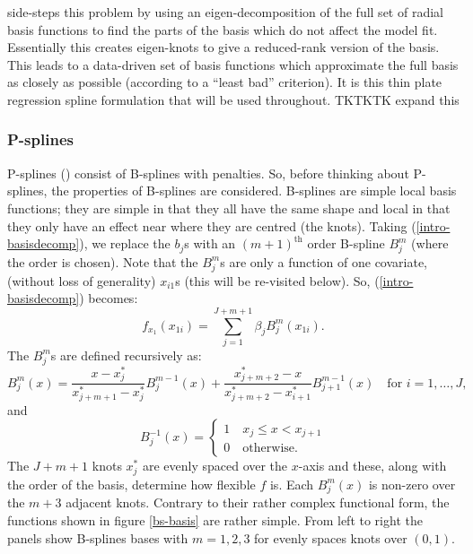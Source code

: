  side-steps this problem by using an eigen-decomposition of the full set of radial basis functions to find the parts of the basis which do not affect the model fit. Essentially this creates eigen-knots to give a reduced-rank version of the basis. This leads to a data-driven set of basis functions which approximate the full basis as closely as possible (according to a ``least bad'' criterion). It is this thin plate regression spline formulation that will be used throughout. TKTKTK expand this

\subsubsection{P-splines}
\label{intro-psplines}

P-splines (\cite{eilersmarx96}) consist of B-splines with penalties. So, before thinking about P-splines, the properties of B-splines are considered. B-splines are simple local basis functions; they are simple in that they all have the same shape and local in that they only have an effect near where they are centred (the knots). Taking (\ref{intro-basisdecomp}), we replace the $b_j$s with an $(m+1)^\text{th}$ order B-spline $B_j^m$ (where the order is chosen). Note that the $B_j^m$s are only a function of one covariate, (without loss of generality) $x_{i1}$s (this will be re-visited below). So, (\ref{intro-basisdecomp}) becomes:
\begin{equation*}
f_{x_1}(x_{1i}) = \sum_{j=1}^{J+m+1} \beta_j B^m_j(x_{1i}).
\end{equation*}
The $B_j^m$s are defined recursively as:
\begin{equation*}
B_j^m(x) = \frac{x-x^*_j}{x^*_{j+m+1} - x^*_j} B_j^{m-1}(x) + \frac{x^*_{j+m+2} -x}{x^*_{j+m+2} - x^*_{i+1}} B_{j+1}^{m-1}(x) \quad \text{for } i=1,\ldots,J,
\end{equation*}
and
\begin{equation*}
 B_j^{-1}(x)=\begin{cases}
1 \quad x_j \leq x < x_{j+1}\\
0 \quad \text{otherwise}. 
\end{cases}
\end{equation*}
The $J+m+1$ knots $x^*_j$ are evenly spaced over the $x$-axis and these, along with the order of the basis, determine how flexible $f$ is. Each $B^m_j(x)$ is non-zero over the $m+3$ adjacent knots. Contrary to their rather complex functional form, the functions shown in figure \ref{bs-basis} are rather simple. From left to right the panels show B-splines bases with $m=1,2,3$ for evenly spaces knots over $(0,1)$.

